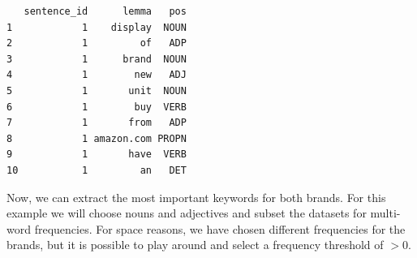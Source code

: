 \begin{Shaded}
\begin{Highlighting}[]
\OtherTok{\textless{}{-}}\SpecialCharTok{\%\textgreater{}\%}
  \NormalTok{(}  \NormalTok{)) }\SpecialCharTok{\%\textgreater{}\%}

\OtherTok{\textless{}{-}}\SpecialCharTok{\%\textgreater{}\%}
  \SpecialCharTok{==} \NormalTok{)}

\OtherTok{\textless{}{-}}\SpecialCharTok{\%\textgreater{}\%}
  \SpecialCharTok{==} \NormalTok{)}

\NormalTok{(sent\_df\_smsng[, }\NormalTok{(}\NormalTok{, }\NormalTok{, }\NormalTok{)], }\NormalTok{)}
\end{Highlighting}
\end{Shaded}

\begin{verbatim}
   sentence_id      lemma   pos
1            1    display  NOUN
2            1         of   ADP
3            1      brand  NOUN
4            1        new   ADJ
5            1       unit  NOUN
6            1        buy  VERB
7            1       from   ADP
8            1 amazon.com PROPN
9            1       have  VERB
10           1         an   DET
\end{verbatim}

Now, we can extract the most important keywords for both brands. For this
example we will choose nouns and adjectives and subset the datasets for
multi-word frequencies. For space reasons, we have chosen different
frequencies for the brands, but it is possible to play around and select a
frequency threshold of \(>0\).

